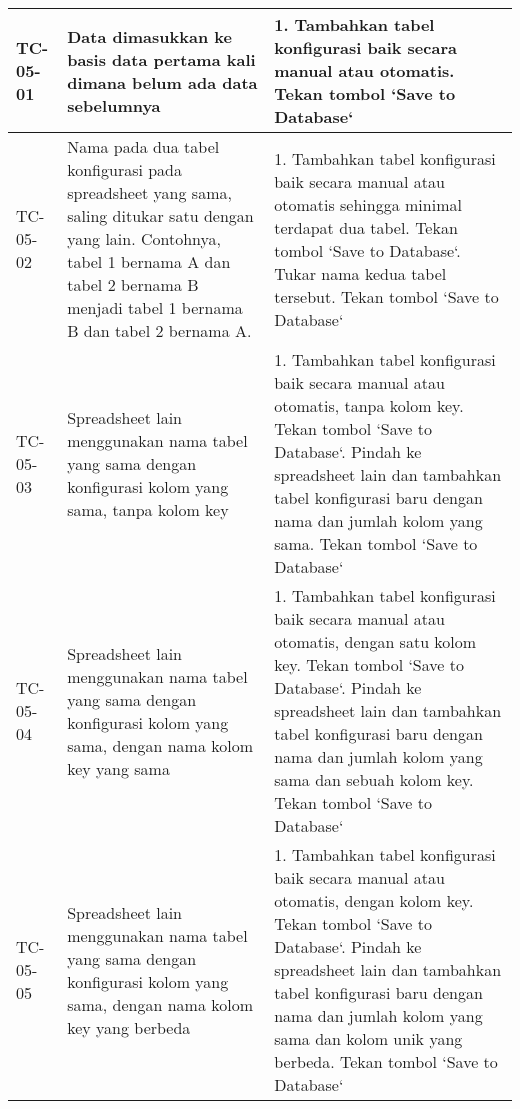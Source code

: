 \begin{small}
\begin{longtable}{ | p{2cm} | p{4cm} | p{7cm} | }
	TC-05-01 & Data dimasukkan ke basis data pertama kali dimana belum ada data sebelumnya & 1. Tambahkan tabel konfigurasi baik secara manual atau otomatis\newline 2. Tekan tombol `Save to Database`\\ \hline 
	TC-05-02 & Nama pada dua tabel konfigurasi pada spreadsheet yang sama, saling ditukar satu dengan yang lain. Contohnya, tabel 1 bernama A dan tabel 2 bernama B menjadi tabel 1 bernama B dan tabel 2 bernama A. & 1. Tambahkan tabel konfigurasi baik secara manual atau otomatis sehingga minimal terdapat dua tabel\newline 2. Tekan tombol `Save to Database`\newline 3. Tukar nama kedua tabel tersebut\newline 4. Tekan tombol `Save to Database`\\ \hline 
	TC-05-03 & Spreadsheet lain menggunakan nama tabel yang sama dengan konfigurasi kolom yang sama, tanpa kolom key & 1. Tambahkan tabel konfigurasi baik secara manual atau otomatis, tanpa kolom key\newline 2. Tekan tombol `Save to Database`\newline 3. Pindah ke spreadsheet lain dan tambahkan tabel konfigurasi baru dengan nama dan jumlah kolom yang sama\newline 4. Tekan tombol `Save to Database`\newline \\ \hline 
	TC-05-04 & Spreadsheet lain menggunakan nama tabel yang sama dengan konfigurasi kolom yang sama, dengan nama kolom key yang sama & 1. Tambahkan tabel konfigurasi baik secara manual atau otomatis, dengan satu kolom key\newline 2. Tekan tombol `Save to Database`\newline 3. Pindah ke spreadsheet lain dan tambahkan tabel konfigurasi baru dengan nama dan jumlah kolom yang sama dan sebuah kolom key\newline 4. Tekan tombol `Save to Database`\newline \\ \hline 
	TC-05-05 & Spreadsheet lain menggunakan nama tabel yang sama dengan konfigurasi kolom yang sama, dengan nama kolom key yang berbeda & 1. Tambahkan tabel konfigurasi baik secara manual atau otomatis, dengan kolom key\newline 2. Tekan tombol `Save to Database`\newline 3. Pindah ke spreadsheet lain dan tambahkan tabel konfigurasi baru dengan nama dan jumlah kolom yang sama dan kolom unik yang berbeda\newline 4. Tekan tombol `Save to Database`\newline \\ \hline 

\end{longtable}
\end{small}
